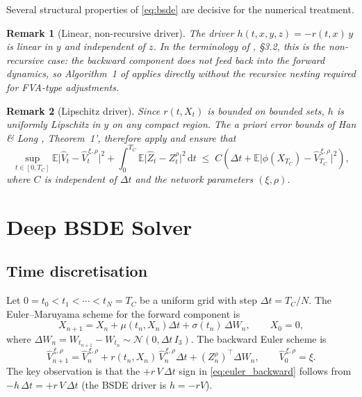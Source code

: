 \documentclass[11pt,a4paper]{article}
\newtheorem{remark}{Remark}
\newcommand{\E}{\mathbb{E}}
\newcommand{\dd}{\,\mathrm{d}}
\begin{document}
Several structural properties of \eqref{eq:bsde} are decisive for the
numerical treatment.

\begin{remark}[Linear, non-recursive driver]
The driver $h(t, x, y, z) = -r(t, x)\, y$ is linear in $y$ and independent
of $z$. In the terminology of \cite{GPR2022}, \S3.2, this is the
\emph{non-recursive} case: the backward component does not feed back into the
forward dynamics, so Algorithm~1 of \cite{GPR2022} applies directly without
the recursive nesting required for FVA-type adjustments.
\end{remark}

\begin{remark}[Lipschitz driver]
Since $r(t, X_t)$ is bounded on bounded sets, $h$ is uniformly Lipschitz in
$y$ on any compact region. The a priori error bounds of Han \& Long
\cite{HL2020}, Theorem~1', therefore apply and ensure that
\begin{equation}
  \sup_{t \in [0,T_C]} \E\bigl|\widehat{V}_t - \widehat{V}^{\,\xi,\rho}_t\bigr|^2
  + \int_0^{T_C} \E\bigl|\widehat{Z}_t - Z^{\rho}_t\bigr|^2 \dd t
  \;\leq\; C\left(\Delta t
    + \E\bigl|\phi(X_{T_C}) - \widehat{V}^{\,\xi,\rho}_{T_C}\bigr|^2\right),
  \label{eq:error_bound}
\end{equation}
where $C$ is independent of $\Delta t$ and the network parameters
$(\xi, \rho)$.
\end{remark}

\section{Deep BSDE Solver}
\label{sec:solver}

\subsection{Time discretisation}

Let $0 = t_0 < t_1 < \cdots < t_N = T_C$ be a uniform grid with step
$\Delta t = T_C / N$. The Euler--Maruyama scheme for the forward component is
\begin{equation}
  X_{n+1} = X_n + \mu(t_n, X_n)\Delta t + \sigma(t_n)\,\Delta W_n,
  \qquad X_0 = 0,
  \label{eq:euler_forward}
\end{equation}
where $\Delta W_n = W_{t_{n+1}} - W_{t_n} \sim \mathcal{N}(0, \Delta t\, I_3)$.
The backward Euler scheme is
\begin{equation}
  \widehat{V}^{\,\xi,\rho}_{n+1} = \widehat{V}^{\,\xi,\rho}_n
    + r(t_n, X_n)\,\widehat{V}^{\,\xi,\rho}_n \Delta t
    + (Z^\rho_n)^\top \Delta W_n,
  \qquad \widehat{V}^{\,\xi,\rho}_0 = \xi.
  \label{eq:euler_backward}
\end{equation}
The key observation is that the $+r\,V\,\Delta t$ sign in \eqref{eq:euler_backward}
follows from $-h\,\Delta t = +r\,V\,\Delta t$ (the BSDE driver is $h = -rV$).
\end{document}
